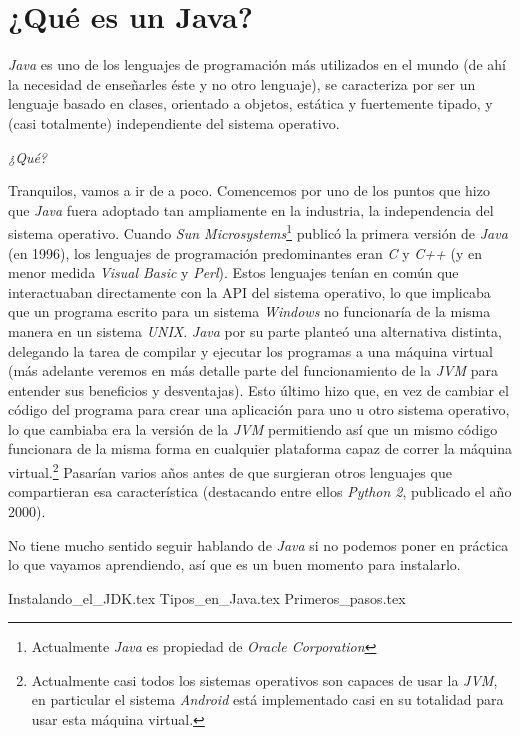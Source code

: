 \chapter{¿Qué es un Java?}
  \label{ch:java}
  \textit{Java} es uno de los lenguajes de programación más utilizados en el mundo (de ahí la 
  necesidad de enseñarles éste y no otro lenguaje), se caracteriza por ser un lenguaje basado en 
  clases, orientado a objetos, estática y fuertemente tipado, y (casi totalmente) independiente del sistema 
  operativo.
  
  \begin{center}
    \textit{¿Qué?}
  \end{center}

  Tranquilos, vamos a ir de a poco.
  Comencemos por uno de los puntos que hizo que \textit{Java} fuera adoptado tan ampliamente en la
  industria, la independencia del sistema operativo.
  Cuando \textit{Sun Microsystems}\footnote{Actualmente \textit{Java} es propiedad de 
  \textit{Oracle Corporation}} publicó la primera versión de \textit{Java} (en 1996), los 
  lenguajes de programación predominantes eran \textit{C} y \textit{C++} (y en menor medida 
  \textit{Visual Basic} y \textit{Perl}).
  Estos lenguajes tenían en común que interactuaban directamente con la API del sistema operativo,
  lo que implicaba que un programa escrito para un sistema \textit{Windows} no funcionaría de la
  misma manera en un sistema \textit{UNIX}.
  \textit{Java} por su parte planteó una alternativa distinta, delegando la tarea de compilar y 
  ejecutar los programas a una máquina virtual (más adelante veremos en más detalle parte del 
  funcionamiento de la \textit{JVM} para entender sus beneficios y desventajas).
  Esto último hizo que, en vez de cambiar el código del programa para crear una aplicación para 
  uno u otro sistema operativo, lo que cambiaba era la versión de la \textit{JVM} permitiendo así
  que un mismo código funcionara de la misma forma en cualquier plataforma capaz de correr la 
  máquina virtual.\footnote{Actualmente casi todos los sistemas operativos son capaces de usar la 
  \textit{JVM}, en particular el sistema \textit{Android} está implementado casi en su totalidad 
  para usar esta máquina virtual.}
  Pasarían varios años antes de que surgieran otros lenguajes que compartieran esa característica
  (destacando entre ellos \textit{Python 2}, publicado el año 2000).

  No tiene mucho sentido seguir hablando de \textit{Java} si no podemos poner en práctica lo que 
  vayamos aprendiendo, así que es un buen momento para instalarlo.
  
  {Instalando_el_JDK.tex}
  {Tipos_en_Java.tex}
  {Primeros_pasos.tex}

\printbibliography[keyword=Por_algo_se_empieza]